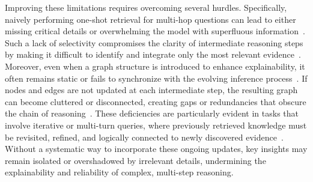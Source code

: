 \documentclass[runningheads]{llncs}
\begin{document}
Improving these limitations requires overcoming several hurdles. Specifically, naively performing one-shot retrieval for multi-hop questions can lead to either missing critical details or overwhelming the model with superfluous information~\cite{jiang2024retrieve}. Such a lack of selectivity compromises the clarity of intermediate reasoning steps by making it difficult to identify and integrate only the most relevant evidence~\cite{luo2025causal,zhu2025mitigating}. Moreover, even when a graph structure is introduced to enhance explainability, it often remains static or fails to synchronize with the evolving inference process~\cite{xu2021dynamic}. If nodes and edges are not updated at each intermediate step, the resulting graph can become cluttered or disconnected, creating gaps or redundancies that obscure the chain of reasoning~\cite{fang2019hierarchical}. These deficiencies are particularly evident in tasks that involve iterative or multi-turn queries, where previously retrieved knowledge must be revisited, refined, and logically connected to newly discovered evidence~\cite{sun2019pullnet}. Without a systematic way to incorporate these ongoing updates, key insights may remain isolated or overshadowed by irrelevant details, undermining the explainability and reliability of complex, multi-step reasoning.
\end{document}
